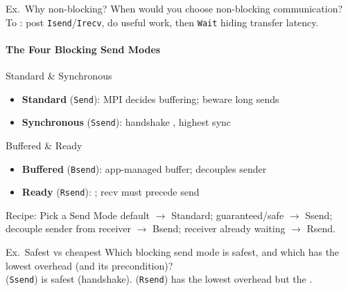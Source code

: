 \multend

\begin{example2}{Ex.\ Why non-blocking?}
    When would you choose non-blocking communication?
     \\ 
    To : post \texttt{Isend}/\texttt{Irecv}, do useful work, then \texttt{Wait} hiding transfer latency.
\end{example2}

\paragraph{The Four Blocking Send Modes}


\begin{definition}{Standard \& Synchronous}
    \begin{itemize}
        \item \textbf{Standard} (\texttt{Send}): MPI decides buffering; beware long sends
        \item \textbf{Synchronous} (\texttt{Ssend}): handshake , highest sync
    \end{itemize}
\end{definition}

\begin{definition}{Buffered \& Ready}
    \begin{itemize}
        \item \textbf{Buffered} (\texttt{Bsend}): app-managed buffer; decouples sender
        \item \textbf{Ready} (\texttt{Rsend}): ; recv must precede send
    \end{itemize}
\end{definition}

\multend

\begin{KR}{Recipe: Pick a Send Mode}
    default $\to$ Standard; guaranteed/safe $\to$ Ssend; decouple sender from receiver $\to$ Bsend; receiver already waiting $\to$ Rsend.
\end{KR}

\begin{example2}{Ex.\ Safest vs cheapest}
    Which blocking send mode is safest, and which has the lowest overhead (and its precondition)?
     \\ 
     (\texttt{Ssend}) is safest (handshake).  (\texttt{Rsend}) has the lowest overhead but the .
\end{example2}

